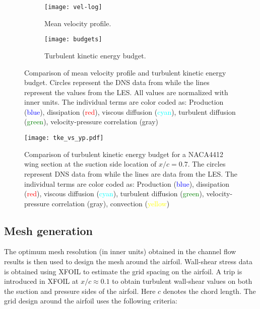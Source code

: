 \begin{figure}[h]
	\begin{subfigure}[t]{0.5\textwidth}
		\centering
		\caption{Mean velocity profile.}		
		\texttt{[image: vel-log]}
		\label{fig:vel_mean}
	\end{subfigure}	
	\begin{subfigure}[t]{0.5\textwidth}
		\centering
		\caption{Turbulent kinetic energy budget.}		
		\texttt{[image: budgets]}
		\label{fig:budget}
	\end{subfigure}
	\caption{Comparison of mean velocity profile and turbulent kinetic energy budget. Circles represent the DNS data from \cite{moser99} while the lines represent the values from the LES. All values are normalized with inner units. The individual terms are color coded as: Production (\textcolor{blue}{blue}), dissipation (\textcolor{red}{red}), viscous diffusion (\textcolor{cyan}{cyan}), turbulent diffusion (\textcolor{green}{green}), velocity-pressure correlation (\textcolor{mygray}{gray})}
\end{figure}

\begin{figure}[h]
	\centering
	\texttt{[image: tke\_vs\_yp.pdf]}
	\caption{Comparison of turbulent kinetic energy budget for a NACA4412 wing section at the suction side location of $x/c=0.7$. The circles represent DNS data from \cite{hosseini16} while the lines are data from the LES. The individual terms are color coded as: Production (\textcolor{blue}{blue}), dissipation (\textcolor{red}{red}), viscous diffusion (\textcolor{cyan}{cyan}), turbulent diffusion (\textcolor{green}{green}), velocity-pressure correlation (\textcolor{mygray}{gray}), convection (\textcolor{yellow}{yellow})}
	\label{fig:wing_budget}
\end{figure}

\subsection{Mesh generation}

The optimum mesh resolution (in inner units) obtained in the channel flow results is then used to design the mesh around the airfoil. Wall-shear stress data is obtained using XFOIL to estimate the grid spacing on the airfoil. A trip is introduced in XFOIL at $x/c\approx0.1$ to obtain turbulent wall-shear values on both the suction and pressure sides of the airfoil. Here $c$ denotes the chord length. The grid design around the airfoil uses the following criteria:

